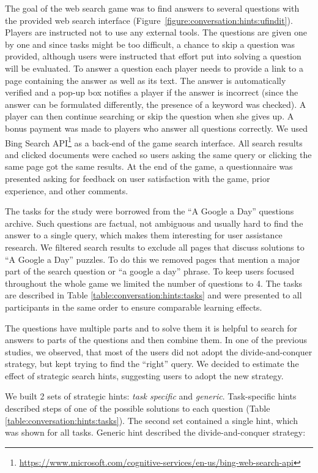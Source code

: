 The goal of the web search game was to find answers to several questions with the provided web search interface (Figure~\ref{figure:conversation:hints:ufindit}).
Players are instructed not to use any external tools.
The questions are given one by one and since tasks might be too difficult, a chance to skip a question was provided, although users were instructed that effort put into solving a question will be evaluated.
To answer a question each player needs to provide a link to a page containing the answer as well as its text.
The answer is automatically verified and a pop-up box notifies a player if the answer is incorrect (since the answer can be formulated differently, the presence of a keyword was checked).
A player can then continue searching or skip the question when she gives up.
A bonus payment was made to players who answer all questions correctly.
We used Bing Search API\footnote{\href{url}{https://www.microsoft.com/cognitive-services/en-us/bing-web-search-api}} as a back-end of the game search interface.
All search results and clicked documents were cached so users asking the same query or clicking the same page got the same results.
At the end of the game, a questionnaire was presented asking for feedback on user satisfaction with the game, prior experience, and other comments.

The tasks for the study were borrowed from the ``A Google a Day'' questions archive.
Such questions are factual, not ambiguous and usually hard to find the answer to a single query, which makes them interesting for user assistance research.
We filtered search results to exclude all pages that discuss solutions to ``A Google a Day'' puzzles.
To do this we removed pages that mention a major part of the search question or ``a google a day'' phrase.
To keep users focused throughout the whole game we limited the number of questions to 4.
The tasks are described in Table \ref{table:conversation:hints:tasks} and were presented to all participants in the same order to ensure comparable learning effects.

The questions have multiple parts and to solve them it is helpful to search for answers to parts of the questions and then combine them.
In one of the previous studies, we observed, that most of the users did not adopt the divide-and-conquer strategy, but kept trying to find the ``right'' query.
We decided to estimate the effect of strategic search hints, suggesting users to adopt the new strategy.

We built 2 sets of strategic hints: \textit{task specific} and \textit{generic}.
Task-specific hints described steps of one of the possible solutions to each question (Table \ref{table:conversation:hints:tasks}).
The second set contained a single hint, which was shown for all tasks. Generic hint described the divide-and-conquer strategy:\\

